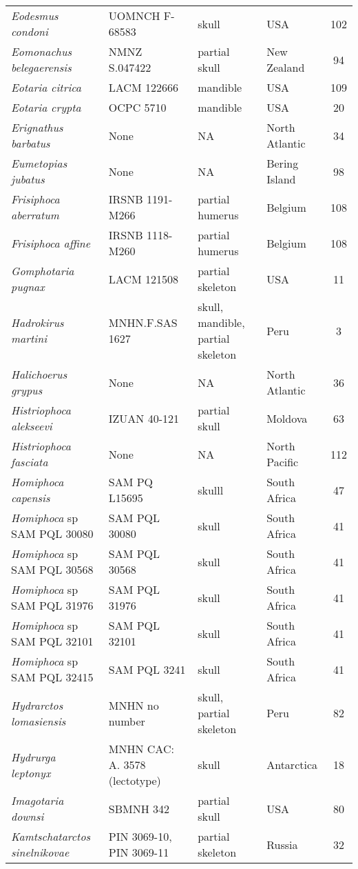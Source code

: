 \begin{longtable}{p{}p{}p{}lc}
\textit{Eodesmus condoni} &	UOMNCH F-68583 & 	skull & 	USA & 102\\
\textit{Eomonachus belegaerensis} &	NMNZ S.047422 & 	partial skull & 	New Zealand & 94\\
\textit{Eotaria citrica} &	LACM 122666 & 	mandible & 	USA & 109\\
\textit{Eotaria crypta} &	OCPC 5710 & 	mandible & 	USA & 20\\
\textit{Erignathus barbatus} &	None & 	NA & 	North Atlantic & 34\\
\textit{Eumetopias jubatus} &	None & 	NA & 	Bering Island & 98\\
\textit{Frisiphoca aberratum} &	IRSNB 1191-M266 & 	partial humerus & 	Belgium & 108\\
\textit{Frisiphoca affine} &	IRSNB 1118-M260 & 	partial humerus & 	Belgium & 108\\
\textit{Gomphotaria pugnax} &	LACM 121508 & 	partial skeleton & 	USA & 11\\
\textit{Hadrokirus martini} &	MNHN.F.SAS 1627 & 	skull, mandible, partial skeleton & 	Peru & 3\\
\textit{Halichoerus grypus} &	None & 	NA & 	North Atlantic & 36\\
\textit{Histriophoca alekseevi} & IZUAN 40-121	& partial skull	& Moldova & 63\\
\textit{Histriophoca fasciata} &	None & 	NA & 	North Pacific & 112\\
\textit{Homiphoca capensis} &	SAM PQ L15695 & 	skulll & 	South Africa & 47\\
\textit{Homiphoca} sp SAM PQL 30080	& SAM PQL 30080 & 	skull & 	South Africa & 41\\
\textit{Homiphoca} sp SAM PQL 30568	& SAM PQL 30568 & 	skull & 	South Africa & 41\\
\textit{Homiphoca} sp SAM PQL 31976	& SAM PQL 31976 & 	skull & 	South Africa & 41\\
\textit{Homiphoca} sp SAM PQL 32101	& SAM PQL 32101 & 	skull & 	South Africa & 41\\
\textit{Homiphoca} sp SAM PQL 32415	& SAM PQL 3241 & 	skull & 	South Africa & 41\\
\textit{Hydrarctos lomasiensis} &	MNHN no number & 	skull, partial skeleton & 	Peru & 82\\
\textit{Hydrurga leptonyx} &	MNHN CAC: A. 3578 (lectotype) & 	skull & 	Antarctica & 18\\
\textit{Imagotaria downsi} &	SBMNH 342 & 	partial skull & 	USA & 80\\
\textit{Kamtschatarctos sinelnikovae} &	PIN 3069-10, PIN 3069-11 & 	partial skeleton & 	Russia & 32\\

\end{longtable}
